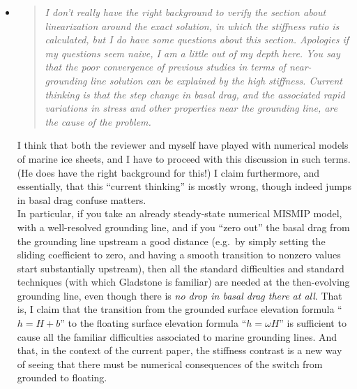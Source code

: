 \documentclass[11pt,reqno]{amsart}
\newcommand{\reply}[2]{
\medskip\medskip
\item  \begin{quote}
\emph{#1}
\end{quote}

\medskip
\noindent #2}
\begin{document}
\begin{itemize}
\reply{I don't really have the right background to verify the section about linearization around the exact solution, in which the stiffness ratio is calculated, but I do have some questions about this section. Apologies if my questions seem naive, I am a little out of my depth here. You say that the poor convergence of previous studies in terms of near-grounding line solution can be explained by the high stiffness. Current thinking is that the step change in basal drag, and the associated rapid variations in stress and other properties near the grounding line, are the cause of the problem.}
{I think that both the reviewer and myself have played with numerical models of marine ice sheets, and I have to proceed with this discussion in such terms.  (He does have the right background for this!)  I claim furthermore, and essentially, that this ``current thinking'' is mostly wrong, though indeed jumps in basal drag confuse matters.\medskip \\
In particular, if you take an already steady-state numerical MISMIP model, with a well-resolved grounding line, and if you ``zero out'' the basal drag from the grounding line upstream a good distance (e.g.~by simply setting the sliding coefficient to zero, and having a smooth transition to nonzero values start substantially upstream), then all the standard difficulties and standard techniques (with which Gladstone is familiar) are needed at the then-evolving grounding line, even though there is \emph{no drop in basal drag there at all}.  That is, I claim that the transition from the grounded surface elevation formula ``$h=H+b$'' to the floating surface elevation formula ``$h=\omega H$'' is sufficient to cause all the familiar difficulties associated to marine grounding lines.  And that, in the context of the current paper, the stiffness contrast is a new way of seeing that there must be numerical consequences of the switch from grounded to floating.}


\end{itemize}
\end{document}
